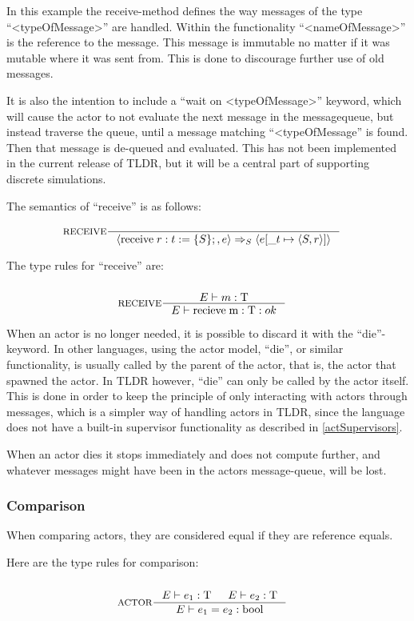 In this example the receive-method defines the way messages of the type \enquote{<typeOfMessage>} are handled. Within the functionality \enquote{<nameOfMessage>} is the reference to the message. This message is immutable no matter if it was mutable where it was sent from. This is done to discourage further use of old messages.

It is also the intention to include a \enquote{wait on <typeOfMessage>} keyword, which will cause the actor to not evaluate the next message in the messagequeue, but instead traverse the queue, until a message matching \enquote{<typeOfMessage} is found. Then that message is de-queued and evaluated. This has not been implemented in the current release of TLDR, but it will be a central part of supporting discrete simulations.

The semantics of \enquote{receive} is as follows:

\begin{align*}
&\inference[$\text{RECEIVE}$]{}
                           {\Braket{\Treceive r:t := \{S\};,e} \Rightarrow_S \Braket{e[\_t \mapsto \Braket{S,r}]}}
\end{align*}

The type rules for \enquote{receive} are:

\begin{align*}
\intertext{}
&\inference[RECEIVE]{\Tenv m : \Tt}
                 {\Tenv \mathbin{\text{recieve}} \; \mathbin{\text{m}} :\Tt : ok }
\end{align*}

When an actor is no longer needed, it is possible to discard it with the \enquote{die}-keyword. In other languages, using the actor model, \enquote{die}, or similar functionality, is usually called by the parent of the actor, that is, the actor that spawned the actor. In TLDR however, \enquote{die} can only be called by the actor itself. This is done in order to keep the principle of only interacting with actors through messages, which is a simpler way of handling actors in TLDR, since the language does not have a built-in supervisor functionality as described in \cref{actSupervisors}. 

When an actor dies it stops immediately and does not compute further, and whatever messages might have been in the actors message-queue, will be lost.

\subsubsection{Comparison}

When comparing actors, they are considered equal if they are reference equals.

Here are the type rules for comparison:

\begin{align*}
\intertext{}
&\inference[ACTOR]{\Tenv e_1: \Tt & \Tenv e_2: \Tt}
                 {\Tenv e_1 = e_2: \Tbool}                 
\end{align*}